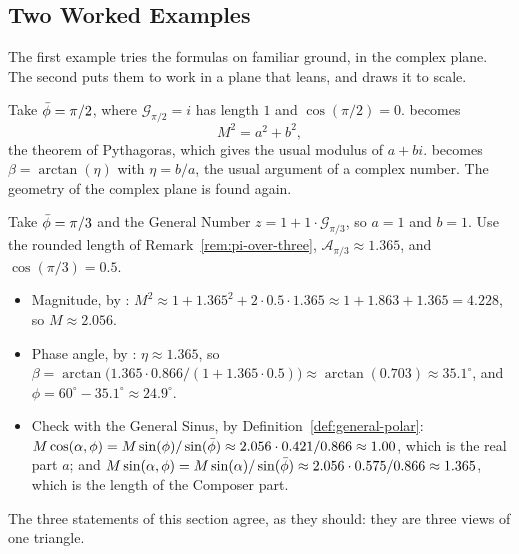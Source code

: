 \subsection{Two Worked Examples}\label{subsec:gn-examples}

The first example tries the formulas on familiar ground, in the complex plane. The second puts them to work in a plane that leans, and  draws it to scale.

\begin{workedexample}
Take $\bar{\phi} = \pi/2$, where $\mathcal{G}_{\pi/2} = i$ has length $1$ and $\cos(\pi/2) = 0$.  becomes
\[
M^2 = a^2 + b^2 ,
\]
the theorem of Pythagoras, which gives the usual modulus of $a + bi$.  becomes $\beta = \arctan(\eta)$ with $\eta = b/a$, the usual argument of a complex number. The geometry of the complex plane is found again.
\end{workedexample}

\begin{workedexample}
Take $\bar{\phi} = \pi/3$ and the General Number $z = 1 + 1 \cdot \mathcal{G}_{\pi/3}$, so $a = 1$ and $b = 1$. Use the rounded length of Remark~\ref{rem:pi-over-three}, $\mathcal{A}_{\pi/3} \approx 1.365$, and $\cos(\pi/3) = 0.5$.
\begin{itemize}
  \item Magnitude, by : $M^2 \approx 1 + 1.365^2 + 2 \cdot 0.5 \cdot 1.365 \approx 1 + 1.863 + 1.365 = 4.228$, so $M \approx 2.056$.
  \item Phase angle, by : $\eta \approx 1.365$, so $\beta = \arctan\bigl(1.365 \cdot 0.866 / (1 + 1.365 \cdot 0.5)\bigr) \approx \arctan(0.703) \approx 35.1^\circ$, and $\phi = 60^\circ - 35.1^\circ \approx 24.9^\circ$.
  \item Check with the General Sinus, by Definition~\ref{def:general-polar}: $M\cos(\alpha, \phi) = M \sin(\phi)/\sin(\bar{\phi}) \approx 2.056 \cdot 0.421 / 0.866 \approx 1.00$, which is the real part $a$; and $M \sin(\alpha, \phi) = M\sin(\alpha)/\sin(\bar{\phi}) \approx 2.056 \cdot 0.575/0.866 \approx 1.365$, which is the length of the Composer part.
\end{itemize}
The three statements of this section agree, as they should: they are three views of one triangle.
\end{workedexample}

